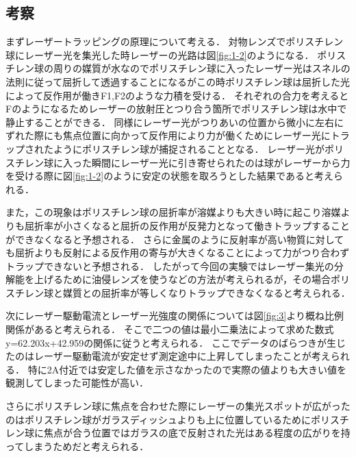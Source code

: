 \documentclass[11pt, a4paper,twocolumn]{jarticle}
\begin{document}
\subsection{考察}
まずレーザートラッピングの原理について考える．
対物レンズでポリスチレン球にレーザー光を集光した時レーザーの光路は図\ref{fig:1-2}のようになる．
ポリスチレン球の周りの媒質が水なのでポリスチレン球に入ったレーザー光はスネルの法則に従って屈折して透過することになるがこの時ポリスチレン球は屈折した光によって反作用が働きF1,F2のような力積を受ける．
それぞれの合力を考えるとFのようになるためレーザーの放射圧とつり合う箇所でポリスチレン球は水中で静止することができる．
同様にレーザー光がつりあいの位置から微小に左右にずれた際にも焦点位置に向かって反作用により力が働くためにレーザー光にトラップされたようにポリスチレン球が捕捉されることとなる．
レーザー光がポリスチレン球に入った瞬間にレーザー光に引き寄せられたのは球がレーザーから力を受ける際に図\ref{fig:1-2}のように安定の状態を取ろうとした結果であると考えられる．

また，この現象はポリスチレン球の屈折率が溶媒よりも大きい時に起こり溶媒よりも屈折率が小さくなると屈折の反作用が反発力となって働きトラップすることができなくなると予想される．
さらに金属のように反射率が高い物質に対しても屈折よりも反射による反作用の寄与が大きくなることによって力がつり合わずトラップできないと予想される．
したがって今回の実験ではレーザー集光の分解能を上げるために油侵レンズを使うなどの方法が考えられるが，その場合ポリスチレン球と媒質との屈折率が等しくなりトラップできなくなると考えられる．

次にレーザー駆動電流とレーザー光強度の関係については図\ref{fig:3}より概ね比例関係があると考えられる．
そこで二つの値は最小二乗法によって求めた数式y=62.203x+42.959の関係に従うと考えられる．
ここでデータのばらつきが生じたのはレーザー駆動電流が安定せず測定途中に上昇してしまったことが考えられる．
特に2A付近では安定した値を示さなかったので実際の値よりも大きい値を観測してしまった可能性が高い．

さらにポリスチレン球に焦点を合わせた際にレーザーの集光スポットが広がったのはポリスチレン球がガラスディッシュよりも上に位置しているためにポリスチレン球に焦点が合う位置ではガラスの底で反射された光はある程度の広がりを持ってしまうためだと考えられる．
\end{document}
